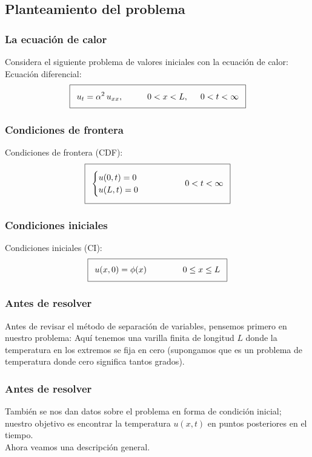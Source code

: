 \subsection{Planteamiento del problema}
\begin{frame}
\frametitle{La ecuación de calor}
Considera el siguiente problema de valores iniciales con la ecuación de calor:
\\
\bigskip
Ecuación diferencial:
\begin{align*}
\addtolength{\fboxsep}{5pt}\boxed{ u_{t} = \alpha^{2} \, u_{xx}, \hspace{1cm} 0 < x < L,\hspace{0.5cm} 0 < t < \infty}
\end{align*}
\end{frame}
\begin{frame}
\frametitle{Condiciones de frontera}
Condiciones de frontera (CDF):
\begin{align*}
\addtolength{\fboxsep}{5pt}\boxed{
\begin{cases}
u(0, t) = 0 \\
u(L, t) = 0
\end{cases}
\hspace{1.5cm}
0 < t < \infty }
\end{align*}
\end{frame}
\begin{frame}
\frametitle{Condiciones iniciales}
Condiciones iniciales (CI):
\begin{align*}
\addtolength{\fboxsep}{5pt}\boxed{
u(x, 0) = \phi (x) \hspace{1.5cm} 0 \leq x \leq L
}
\end{align*}
\end{frame}
\begin{frame}
\frametitle{Antes de resolver}
Antes de revisar el método de separación de variables, pensemos primero en nuestro problema: Aquí tenemos una varilla finita de longitud $L$ donde la temperatura en los extremos se fija en cero (supongamos que es un problema de temperatura donde cero significa tantos grados).
\end{frame}
\begin{frame}
\frametitle{Antes de resolver}
También se nos dan datos sobre el problema en forma de condición inicial; nuestro objetivo es encontrar la temperatura $u (x, t)$ en puntos posteriores en el tiempo.
\\
\bigskip
\pause
Ahora veamos una descripción general.
\end{frame}
